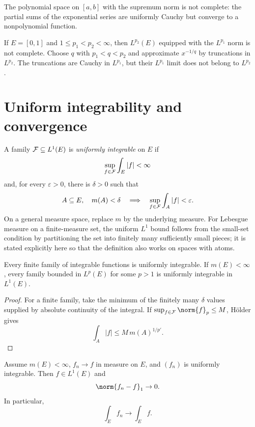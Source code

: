 \begin{eg}
The polynomial space on $[a,b]$ with the supremum norm is not complete: the partial sums of the exponential series are uniformly Cauchy but converge to a nonpolynomial function.

If $E=[0,1]$ and $1\leq p_1<p_2<\infty$, then $L^{p_2}(E)$ equipped with the $L^{p_1}$ norm is not complete. Choose $q$ with $p_1<q<p_2$ and approximate $x^{-1/q}$ by truncations in $L^{p_2}$. The truncations are Cauchy in $L^{p_1}$, but their $L^{p_1}$ limit does not belong to $L^{p_2}$.
\end{eg}

\section{Uniform integrability and convergence}

\begin{de}
A family $\mathcal{F}\subseteq L^1(E)$ is \emph{uniformly integrable} on $E$ if
\[
\sup_{f\in\mathcal{F}}\int_E|f|<\infty
\]
and, for every $\varepsilon>0$, there is $\delta>0$ such that
\[
A\subseteq E,\quad m(A)<\delta
\quad\Longrightarrow\quad
\sup_{f\in\mathcal{F}}\int_A|f|<\varepsilon.
\]
On a general measure space, replace $m$ by the underlying measure. For Lebesgue measure on a finite-measure set, the uniform $L^1$ bound follows from the small-set condition by partitioning the set into finitely many sufficiently small pieces; it is stated explicitly here so that the definition also works on spaces with atoms.
\end{de}

\begin{prop}
Every finite family of integrable functions is uniformly integrable. If $m(E)<\infty$, every family bounded in $L^p(E)$ for some $p>1$ is uniformly integrable in $L^1(E)$.
\end{prop}

\begin{proof}
For a finite family, take the minimum of the finitely many $\delta$ values supplied by absolute continuity of the integral. If $\sup_{f\in\cF}\norm{f}_p\leq M$, Hölder gives
\[
\int_A|f|\leq M\,m(A)^{1/p'}.
\]
\end{proof}

\begin{thm}
Assume $m(E)<\infty$, $f_n\to f$ in measure on $E$, and $(f_n)$ is uniformly integrable. Then $f\in L^1(E)$ and
\[
\norm{f_n-f}_1\to0.
\]
In particular,
\[
\int_Ef_n\to\int_Ef.
\]
\end{thm}

